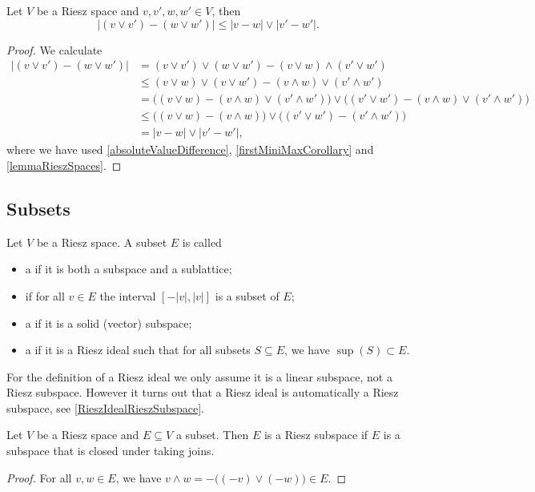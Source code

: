 \begin{proposition}
Let $V$ be a Riesz space and $v,v',w,w'\in V$, then
\[ |(v\vee v')- (w\vee w')| \leq |v-w| \vee |v'- w'|. \]
\end{proposition}
\begin{proof}
We calculate
\begin{align*}
|(v\vee v')- (w\vee w')| &= (v\vee v')\vee(w\vee w') - (v\vee w)\wedge (v'\vee w') \\
&\leq (v\vee w)\vee(v\vee w') - (v\wedge w)\vee (v'\wedge w') \\
&= \big((v\vee w) - (v\wedge w)\vee (v'\wedge w')\big)\vee\big((v'\vee w') - (v\wedge w)\vee (v'\wedge w')\big) \\
&\leq \big((v\vee w) - (v\wedge w)\big)\vee\big((v'\vee w') - (v'\wedge w')\big) \\
&= |v-w|\vee |v'-w'|,
\end{align*}
where we have used \ref{absoluteValueDifference}, \ref{firstMiniMaxCorollary} and \ref{lemmaRieszSpaces}.
\end{proof}

\subsection{Subsets}
\begin{definition}
Let $V$ be a Riesz space. A subset $E$ is called
\begin{itemize}
\item a  if it is both a subspace and a sublattice;
\item {} if for all $v\in E$ the interval $[-|v|,|v|]$ is a subset of $E$;
\item a  if it is a solid (vector) subspace;
\item a  if it is a Riesz ideal such that for all subsets $S\subseteq E$, we have $\sup(S) \subset E$. 
\end{itemize}
\end{definition}
For the definition of a Riesz ideal we only assume it is a linear subspace, not a Riesz subspace. However it turns out that a Riesz ideal is automatically a Riesz subspace, see \ref{RieszIdealRieszSubspace}. 

\begin{lemma} \label{RieszSubspaceJoinClosure}
Let $V$ be a Riesz space and $E\subseteq V$ a subset. Then $E$ is a Riesz subspace if $E$ is a subspace that is closed under taking joins.
\end{lemma}
\begin{proof}
For all $v,w\in E$, we have $v\wedge w = -\big((-v)\vee (-w)\big)\in E$.
\end{proof}

